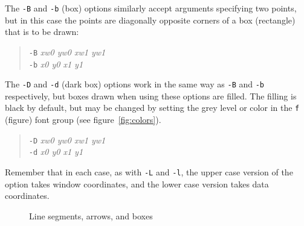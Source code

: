 \documentclass{book}
\begin{document}
%
%
The {\tt -B} and {\tt -b} (box) options similarly accept arguments
specifying two points, but in this case the points are diagonally
opposite corners of a box (rectangle) that is to be drawn:

\begin{quote}
{\tt -B} \emph{xw0 yw0 xw1 yw1}\\
{\tt -b} \emph{x0 y0 x1 y1}
\end{quote}

%
%
%
%
The {\tt -D} and {\tt -d} (dark box) options work in the same way as
{\tt -B} and {\tt -b} respectively, but boxes drawn when using these
options are filled.  The filling is black by default, but may be changed
by setting the grey level or color in the {\tt f} (figure) font group
(see figure~\ref{fig:colors}).

\begin{quote}
{\tt -D} \emph{xw0 yw0 xw1 yw1}\\
{\tt -d} \emph{x0 y0 x1 y1}
\end{quote}

Remember that in each case, as with {\tt -L} and {\tt -l}, the upper
case version of the option takes window coordinates, and the lower
case version takes data coordinates.

\begin{figure}
\begin{center}
\end{center}
\caption{Line segments, arrows, and boxes \label{fig:flowchart}}
\end{figure}
\end{document}
